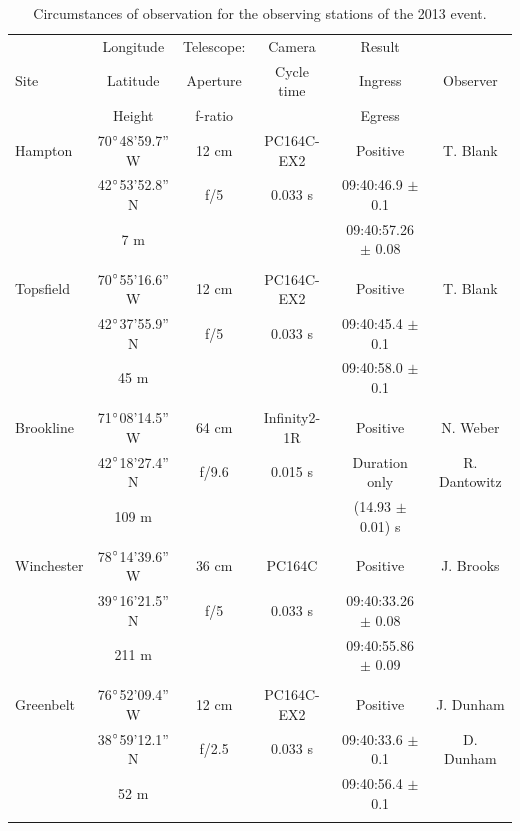 \documentclass[useAMS,usenatbib]{mn2e}
\begin{document}
\begin{table}
 \centering
 \begin{minipage}{140mm}
  \caption{Circumstances of observation for the observing stations of the 2013 event.\label{Tab: obs-2013}}
  \begin{tabular}{@{}lccccc}
  \hline
          & Longitude & Telescope: & Camera  & Result &   \\
     Site & Latitude  & Aperture  & Cycle time & Ingress & Observer\\          
          & Height    & f-ratio    &           & Egress    & \\          
\hline
 Hampton & 70$\hbox{$^\circ$}$48'59.7'' W & 12 cm & PC164C-EX2 & Positive & T. Blank \\
  &42$\hbox{$^\circ$}$53'52.8'' N & f/5 & 0.033 s     & 09:40:46.9 $\pm$ 0.1 &   \\
            & 7 m       &  &     & 09:40:57.26  $\pm$ 0.08 &   \\
 & & & & & \\
 Topsfield & 70$\hbox{$^\circ$}$55'16.6'' W & 12 cm & PC164C-EX2 & Positive & T. Blank \\
  &42$\hbox{$^\circ$}$37'55.9'' N & f/5      & 0.033 s   & 09:40:45.4 $\pm$ 0.1 &   \\
            & 45 m      &  &     & 09:40:58.0  $\pm$ 0.1 &   \\
 & & & & & \\
 Brookline & 71$\hbox{$^\circ$}$08'14.5'' W & 64 cm & Infinity2-1R & Positive & N. Weber \\
  &42$\hbox{$^\circ$}$18'27.4'' N & f/9.6 & 0.015 s     & Duration only &  R. Dantowitz  \\
            & 109 m     &       &     & (14.93 $\pm$ 0.01) s &   \\
 & & & & & \\
 Winchester & 78$\hbox{$^\circ$}$14'39.6'' W & 36 cm & PC164C & Positive & J. Brooks \\
  &39$\hbox{$^\circ$}$16'21.5'' N & f/5 & 0.033 s    & 09:40:33.26 $\pm$ 0.08 &   \\
            & 211 m     &  &     & 09:40:55.86  $\pm$ 0.09 &   \\
 & & & & & \\
 Greenbelt & 76$\hbox{$^\circ$}$52'09.4'' W & 12 cm & PC164C-EX2 & Positive & J. Dunham \\
  &38$\hbox{$^\circ$}$59'12.1'' N & f/2.5 & 0.033 s    & 09:40:33.6 $\pm$ 0.1 & D. Dunham  \\
            & 52 m      &   &     & 09:40:56.4  $\pm$ 0.1 &   \\
 & & & & & \\

\end{tabular}
\end{minipage}
\end{table}
\end{document}
